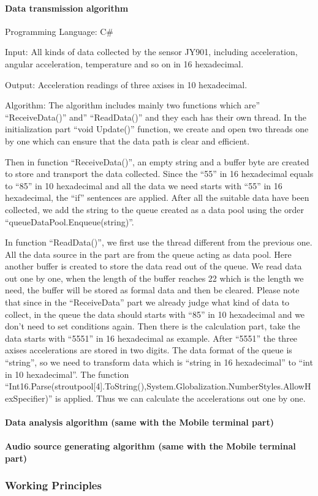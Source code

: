 \paragraph{Data transmission algorithm}

Programming Language: C\#

Input: All kinds of data collected by the sensor JY901, including acceleration,
angular acceleration, temperature and so on in 16 hexadecimal.   

Output: Acceleration readings of three axises in 10 hexadecimal. 

Algorithm: The algorithm includes mainly two functions which are''
``ReceiveData()'' and'' ``ReadData()'' and they each has their own thread. In
the initialization part “void Update()” function, we create and open two threads
one by one which can ensure that the data path is clear and efficient. 

Then in function ``ReceiveData()'', an empty string and a buffer byte are
created to store and transport the data collected. Since the “55” in 16
hexadecimal equals to “85” in 10 hexadecimal and all the data we need starts
with “55” in 16 hexadecimal, the “if” sentences are applied. After all the
suitable data have been collected, we add the string to the queue created as a
data pool using the order “queueDataPool.Enqueue(string)”. 

In function ``ReadData()'', we first use the thread different from the previous
one. All the data source in the part are from the queue acting as data pool.
Here another buffer is created to store the data read out of the queue. We read
data out one by one, when the length of the buffer reaches 22 which is the
length we need, the buffer will be stored as formal data and then be cleared.
Please note that since in the “ReceiveData” part we already judge what kind of
data to collect, in the queue the data should starts with “85” in 10 hexadecimal
and we don’t need to set conditions again. Then there is the calculation part,
take the data starts with “5551” in 16 hexadecimal as example. After “5551” the
three axises accelerations are stored in two digits. The data format of the
queue is “string”, so we need to transform data which is “string in 16
hexadecimal” to “int in 10 hexadecimal”. The function
“Int16.Parse(stroutpool[4].ToString(),System.Globalization.NumberStyles.AllowHexSpecifier)” 
is applied. Thus we can calculate the accelerations out one by one.

\paragraph{Data analysis algorithm (same with the Mobile terminal part)}

\paragraph{Audio source generating algorithm (same with the Mobile terminal
  part)} 

\subsubsection{Working Principles}
